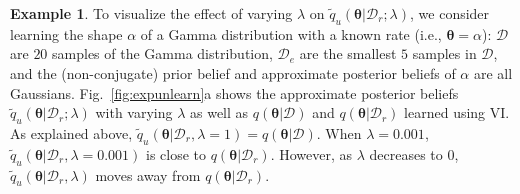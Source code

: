 \documentclass{article}
\theoremstyle{definition}
\newtheorem{example}{Example}
\newcommand{\todo}[1]{}
\newcommand{\mcl}[1]{\mathcal{#1}}
\newcommand{\da}{\mcl{D}}
\newcommand{\dc}{\mcl{D}_r}
\newcommand{\dr}{\mcl{D}_e}
\newcommand{\eubo}{\tilde{q}_u}
\begin{document}
\todo{should we mention how to choose $\lambda$?}
%
\begin{example}
\label{exp:gamma}
To visualize the effect of varying $\lambda$ on $\eubo(\bm{\theta}|\dc;\lambda)$, we consider learning the shape $\alpha$ of a Gamma distribution with a known rate %
(i.e., $\bm{\theta} = \alpha$): $\da$ are $20$ samples of the Gamma distribution, $\dr$ are the smallest $5$ samples in $\da$, and the (non-conjugate) prior belief and approximate %
posterior beliefs of $\alpha$ are all Gaussians.
Fig.~\ref{fig:expunlearn}a shows the approximate posterior beliefs  $\eubo(\bm{\theta}|\dc; \lambda)$ with varying $\lambda$ as well as  $q(\bm{\theta}|\da)$ and 
$q(\bm{\theta}|\dc)$ learned using VI. 
As explained above, $\eubo(\bm{\theta}|\dc, \lambda=1) = q(\bm{\theta}|\da)$. 
When $\lambda = 0.001$, $\eubo(\bm{\theta}|\dc, \lambda=0.001)$ is close to %
$q(\bm{\theta}|\dc)$. 
However, as $\lambda$ decreases to $0$, $\eubo(\bm{\theta}|\dc, \lambda)$ moves away from $q(\bm{\theta}|\dc)$.
\end{example}
%
\end{document}
